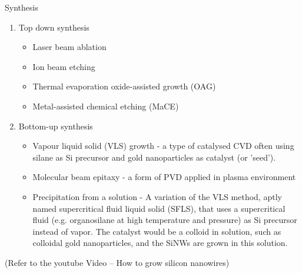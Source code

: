 \documentclass[11pt,dvipsnames,ignorenonframetext,aspectratio=169]{beamer}
\providecommand{\tightlist}{%
  \setlength{\itemsep}{0pt}\setlength{\parskip}{0pt}}
\begin{document}
\begin{frame}{Synthesis}
\protect\hypertarget{synthesis}{}
\footnotesize

\begin{enumerate}
\tightlist
\item
  Top down synthesis

  \begin{itemize}
  \scriptsize
  \item Laser beam ablation
  \item Ion beam etching
  \item Thermal evaporation oxide-assisted growth (OAG)
  \item Metal-assisted chemical etching (MaCE)
  \end{itemize}
\item
  Bottom-up synthesis

  \begin{itemize}
  \scriptsize
  \item Vapour liquid solid (VLS) growth - a type of catalysed CVD often using silane as Si precursor and gold nanoparticles as catalyst (or 'seed').
  \item Molecular beam epitaxy - a form of PVD applied in plasma environment
  \item Precipitation from a solution - A variation of the VLS method, aptly named supercritical fluid liquid solid (SFLS), that uses a supercritical fluid (e.g. organosilane at high temperature and pressure) as Si precursor instead of vapor. The catalyst would be a colloid in solution, such as colloidal gold nanoparticles, and the SiNWs are grown in this solution.
  \end{itemize}
\end{enumerate}

(Refer to the youtube Video -- How to grow silicon nanowires)
\end{frame}
\end{document}
